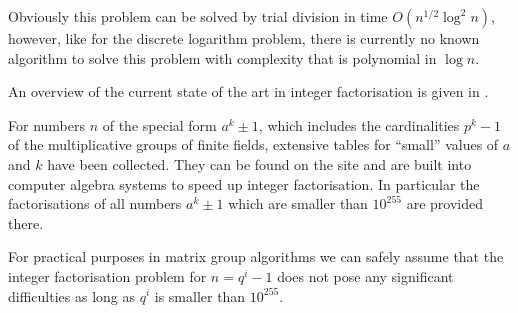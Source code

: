 Obviously this problem can be solved by trial division in time
$O(n^{1/2} \log^2 n)$, however, like for the discrete logarithm problem, 
there is currently no known
algorithm to solve this problem with complexity that is polynomial
in $\log n$.

An overview of the current state of the art in integer factorisation
is given in \cite{gabifaktorisierung}.

For numbers $n$ of the special form $a^k \pm 1$, which includes the
cardinalities $p^k - 1$ of the multiplicative groups of finite fields,
extensive tables for ``small'' values of $a$ and $k$ have been
collected. They can be found on the site \cite{brentfact} and are
built into computer algebra systems to speed up integer factorisation.
In particular the factorisations of all numbers $a^k \pm 1$ which are
smaller than $10^{255}$ are provided there.

For practical purposes in matrix group algorithms 
we can safely assume that the integer factorisation
problem for $n = q^i - 1$ 
does not pose any significant difficulties as long as $q^i$ is
smaller than $10^{255}$.
%


